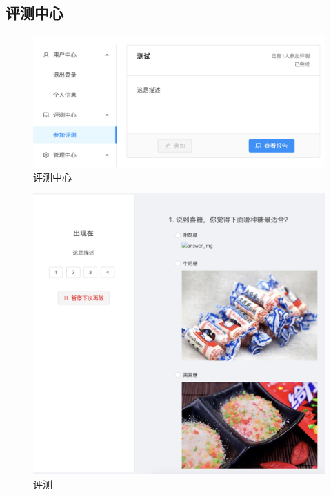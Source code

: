 \subsection{评测中心}

\begin{figure}[thbp!]
	\centering
	\includegraphics[width=1.0\linewidth]{figure/test}
	\caption{评测中心}
	\label{fig:test}
\end{figure}

\begin{figure}[thbp!]
	\centering
	\includegraphics[width=1.0\linewidth]{figure/test_main}
	\caption{评测}
	\label{fig:test_main}
\end{figure}


